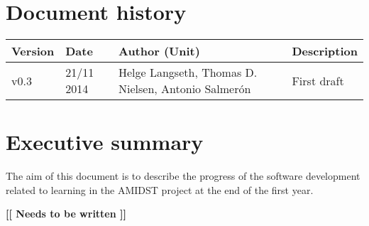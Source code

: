 \documentclass[11pt, oneside]{article}   	%
\renewcommand{\comment}[1]{\begin{center}\textbf{[[  #1 ]]}\end{center}}
\begin{document}
\tableofcontents

\newpage


\section*{Document history}

\begin{table}[htbp]
  \centering
  \begin{tabularx}{\linewidth}{|p{17mm}|p{17mm}|X|X|}\hline
    {\bf Version} & {\bf Date} & {\bf Author (Unit)} & {\bf Description} \\ \hline \hline
    v0.3 & 21/11 2014 & Helge Langseth, Thomas D. Nielsen,   Antonio Salmer\'on & First draft   \\ \hline
\hline
  \end{tabularx}
\end{table}

\newpage



\section{Executive summary}

The aim of this document is to describe the progress of the software development related to learning in the AMIDST project at the end of the first year. 

\comment{Needs to be written}

 
\newpage












%
%
\end{document}
